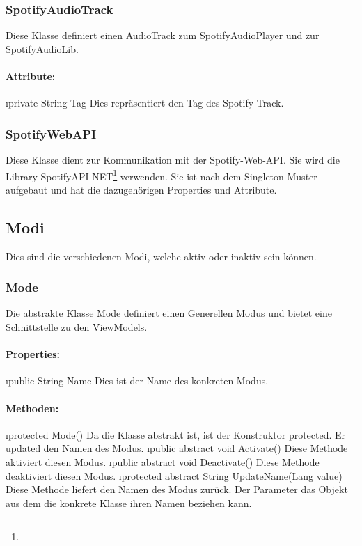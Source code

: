 \documentclass[../entwurf.tex]{subfiles}
\begin{document}
			\subsubsection{SpotifyAudioTrack}
				Diese Klasse definiert einen AudioTrack zum SpotifyAudioPlayer und zur SpotifyAudioLib.
				\paragraph{Attribute:}
					\begin{itemize}
						\i{private String Tag} Dies repräsentiert den Tag des Spotify Track.
					\end{itemize}
			\subsubsection{SpotifyWebAPI}
				Diese Klasse dient zur Kommunikation mit der Spotify-Web-API. Sie wird die Library 
				SpotifyAPI-NET\footnote{} verwenden.
				Sie ist nach dem Singleton Muster aufgebaut und hat die dazugehörigen Properties und Attribute.
		\subsection{Modi}
			Dies sind die verschiedenen Modi, welche aktiv oder inaktiv sein können.
			\subsubsection{Mode}
				Die abstrakte Klasse Mode definiert einen Generellen Modus und bietet eine Schnittstelle zu den ViewModels.
				\paragraph{Properties:}
					\begin{itemize}
						\i{public String Name} Dies ist der Name des konkreten Modus.
					\end{itemize}
				\paragraph{Methoden:}
					\begin{itemize}
						\i{protected Mode()} Da die Klasse abstrakt ist, ist der Konstruktor protected. Er updated den Namen des Modus.
						\i{public abstract void Activate()} Diese Methode aktiviert diesen Modus.
						\i{public abstract void Deactivate()} Diese Methode deaktiviert diesen Modus.
						\i{protected abstract String UpdateName(Lang value)}  Diese Methode liefert den Namen des Modus zurück. Der Parameter das
						Objekt aus dem die konkrete Klasse ihren Namen beziehen kann.
					\end{itemize}
\end{document}
